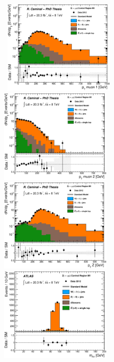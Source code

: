 \begin{figure}[!ht]
  \begin{center}
    \mbox{
      \includegraphics[width=0.495\textwidth]{MonojetAnalysis/Figures/plot_Stop_A6_CRzmm_m_pt_fitted.eps}
      \includegraphics[width=0.495\textwidth]{MonojetAnalysis/Figures/plot_Stop_A6_CRzmm_m2_pt_fitted.eps}
    }
    \mbox{
      \includegraphics[width=0.495\textwidth]{MonojetAnalysis/Figures/plot_Stop_A6_CRzmm_m_Zpt_fitted.eps}
      \includegraphics[width=0.495\textwidth]{MonojetAnalysis/Figures/plot_Stop_A6_CRzmm_m_M_fitted.eps}
}
\end{center}
\end{figure}
